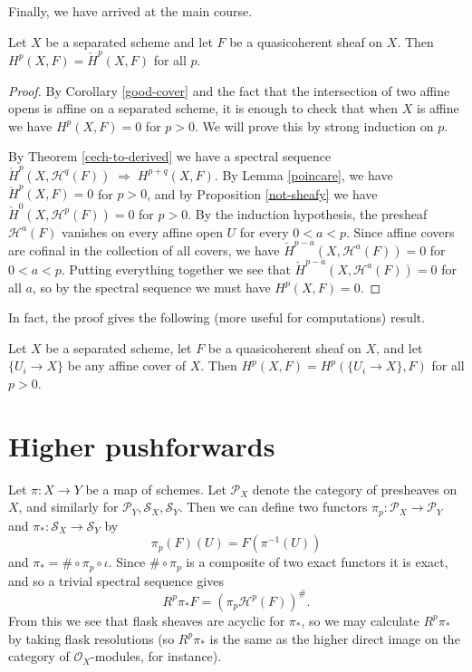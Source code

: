 Finally, we have arrived at the main course.

\begin{thm}\label{cech-to-sheaf} Let $X$ be a separated scheme and let $F$ be a quasicoherent sheaf on $X$. Then $H^p(X,F) = \check{H}^p(X,F)$ for all $p$.
\end{thm}
\begin{proof} By Corollary \ref{good-cover} and the fact that the intersection of two affine opens is affine on a separated scheme, it is enough to check that when $X$ is affine we have $H^p(X,F) = 0$ for $p > 0$. We will prove this by strong induction on $p$.

By Theorem \ref{cech-to-derived} we have a spectral sequence $\check{H}^p(X,\mathcal{H}^q(F))\;\Rightarrow\;H^{p+q}(X,F)$. By Lemma \ref{poincare}, we have $\check{H}^p(X,F) = 0$ for $p>0$, and by Proposition \ref{not-sheafy} we have $\check{H}^0(X,\mathcal{H}^p(F)) = 0$ for $p > 0$. By the induction hypothesis, the presheaf $\mathcal{H}^a(F)$ vanishes on every affine open $U$ for every $0 < a < p$. Since affine covers are cofinal in the collection of all covers, we have $\check{H}^{p-a}(X,\mathcal{H}^a(F)) = 0$ for $0 < a < p$. Putting everything together we see that $\check{H}^{p-a}(X,\mathcal{H}^a(F)) = 0$ for all $a$, so by the spectral sequence we must have $H^p(X,F) = 0$.
\end{proof}

In fact, the proof gives the following (more useful for computations) result.

\begin{cor} Let $X$ be a separated scheme, let $F$ be a quasicoherent sheaf on $X$, and let $\{U_i\rightarrow X\}$ be any affine cover of $X$. Then $H^p(X,F) = H^p(\{U_i\rightarrow X\},F)$ for all $p > 0$.
\end{cor}

\section{Higher pushforwards}

Let $\pi : X \rightarrow Y$ be a map of schemes. Let $\mathcal{P}_X$ denote the category of presheaves on $X$, and similarly for $\mathcal{P}_Y, \mathcal{S}_X, \mathcal{S}_Y$. Then we can define two functors $\pi_p : \mathcal{P}_X \rightarrow \mathcal{P}_Y$ and $\pi_* : \mathcal{S}_X \rightarrow \mathcal{S}_Y$ by
\[
\pi_p(F)(U) = F(\pi^{-1}(U))
\]
and $\pi_* = \#\circ\pi_p\circ\iota$. Since $\#\circ\pi_p$ is a composite of two exact functors it is exact, and so a trivial spectral sequence gives
\[
R^p\pi_*F = (\pi_p\mathcal{H}^p(F))^\#.
\]
From this we see that flask sheaves are acyclic for $\pi_*$, so we may calculate $R^p\pi_*$ by taking flask resolutions (so $R^p\pi_*$ is the same as the higher direct image on the category of $\mathcal{O}_X$-modules, for instance).

